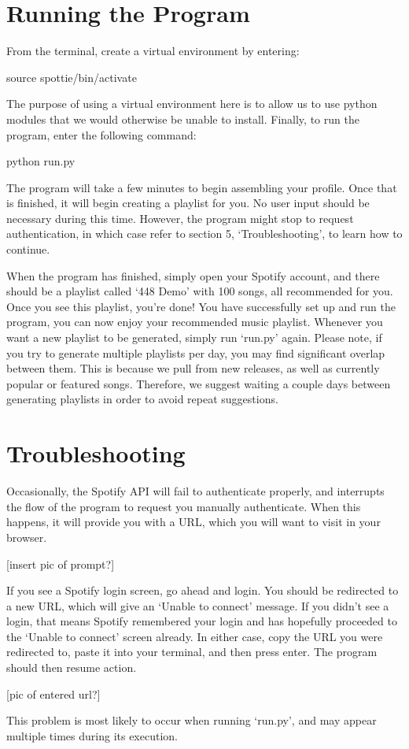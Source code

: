 \documentclass{roffin}
\begin{document}
\section{Running the Program} 
From the terminal, create a virtual environment by entering:
\newline

\hspace{1cm} source spottie/bin/activate

\hfill
\newline
The purpose of using a virtual environment here is to allow us to use python modules that we would otherwise be unable to install. Finally, to run the program, enter the following command:
\newline

\hspace{1cm} python run.py

\hfill
\newline
The program will take a few minutes to begin assembling your profile. Once that is finished, it will begin creating a playlist for you. No user input should be necessary during this time. However, the program might stop to request authentication, in which case refer to section 5, `Troubleshooting', to learn how to continue.

When the program has finished, simply open your Spotify account, and there should be a playlist called `448 Demo' with 100 songs, all recommended for you. Once you see this playlist, you're done! You have successfully set up and run the program, you can now enjoy your recommended music playlist. Whenever you want a new playlist to be generated, simply run `run.py' again. Please note, if you try to generate multiple playlists per day, you may find significant overlap between them. This is because we pull from new releases, as well as currently popular or featured songs. Therefore, we suggest waiting a couple days between generating playlists in order to avoid repeat suggestions.

\section{Troubleshooting} 
Occasionally, the Spotify API will fail to authenticate properly, and interrupts the flow of the program to request you manually authenticate. When this happens, it will provide you with a URL, which you will want to visit in your browser.

[insert pic of prompt?]

If you see a Spotify login screen, go ahead and login. You should be redirected to a new URL, which will give an `Unable to connect' message. If you didn't see a login, that means Spotify remembered your login and has hopefully proceeded to the `Unable to connect' screen already. In either case, copy the URL you were redirected to, paste it into your terminal, and then press enter. The program should then resume action. 

[pic of entered url?]

This problem is most likely to occur when running `run.py', and may appear multiple times during its execution.
\end{document}
